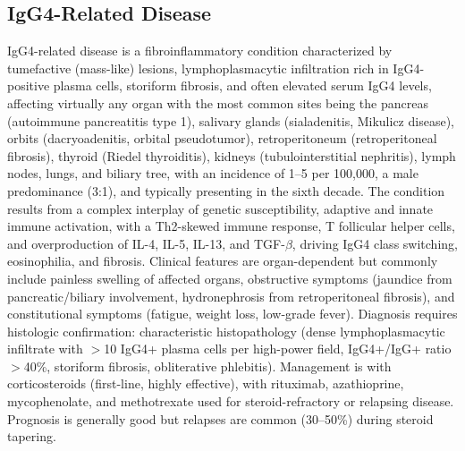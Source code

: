 \subsection{IgG4-Related Disease}
\label{sec:IgG4-Related Disease}
IgG4-related disease is a fibroinflammatory condition characterized by tumefactive (mass-like) lesions, lymphoplasmacytic infiltration rich in IgG4-positive plasma cells, storiform fibrosis, and often elevated serum IgG4 levels, affecting virtually any organ with the most common sites being the pancreas (autoimmune pancreatitis type 1), salivary glands (sialadenitis, Mikulicz disease), orbits (dacryoadenitis, orbital pseudotumor), retroperitoneum (retroperitoneal fibrosis), thyroid (Riedel thyroiditis), kidneys (tubulointerstitial nephritis), lymph nodes, lungs, and biliary tree, with an incidence of 1--5 per 100,000, a male predominance (3:1), and typically presenting in the sixth decade. The condition results from a complex interplay of genetic susceptibility, adaptive and innate immune activation, with a Th2-skewed immune response, T follicular helper cells, and overproduction of IL-4, IL-5, IL-13, and TGF-$\beta$, driving IgG4 class switching, eosinophilia, and fibrosis. Clinical features are organ-dependent but commonly include painless swelling of affected organs, obstructive symptoms (jaundice from pancreatic/biliary involvement, hydronephrosis from retroperitoneal fibrosis), and constitutional symptoms (fatigue, weight loss, low-grade fever). Diagnosis requires histologic confirmation: characteristic histopathology (dense lymphoplasmacytic infiltrate with $>$10 IgG4+ plasma cells per high-power field, IgG4+/IgG+ ratio $>$40\%, storiform fibrosis, obliterative phlebitis). Management is with corticosteroids (first-line, highly effective), with rituximab, azathioprine, mycophenolate, and methotrexate used for steroid-refractory or relapsing disease. Prognosis is generally good but relapses are common (30--50\%) during steroid tapering.

